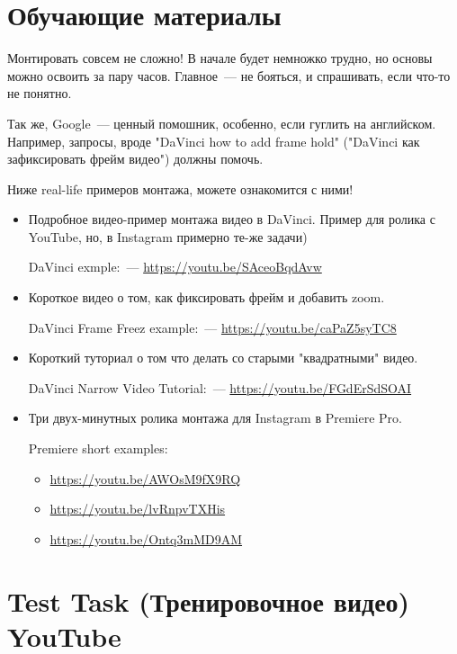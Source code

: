 \documentclass[
a4paper, %
12pt, %
article,
onecolumn, %
openany, %
]{memoir}
\begin{document}
\newpage
\section{Обучающие материалы}

Монтировать совсем не сложно! В начале будет немножко трудно, но основы можно
освоить за пару часов. Главное~--- не бояться, и спрашивать, если что-то не понятно.

Так же, Google~--- ценный помошник, особенно, если гуглить на английском.
Например, запросы, вроде
"DaVinci how to add frame hold" ("DaVinci как зафиксировать фрейм видео")
должны помочь.

Ниже real-life примеров монтажа, можете ознакомится с ними!
\begin{itemize}
    \item Подробное видео-пример монтажа видео в DaVinci.
        Пример для ролика с YouTube, но, в
        Instagram примерно те-же задачи)

        DaVinci exmple:~--- \href{https://youtu.be/SAceoBqdAvw}{https://youtu.be/SAceoBqdAvw}
    \item Короткое видео о том, как фиксировать фрейм и добавить zoom.

        DaVinci Frame Freez example:~--- \href{https://youtu.be/caPaZ5syTC8}{https://youtu.be/caPaZ5syTC8}
    \item Короткий туториал о том что делать со старыми "квадратными" видео.

        DaVinci Narrow Video Tutorial:~--- \href{https://youtu.be/FGdErSdSOAI}{https://youtu.be/FGdErSdSOAI}

    \item Три двух-минутных ролика монтажа для Instagram в Premiere Pro.

        Premiere short examples:
        \begin{itemize}
            \item \href{https://youtu.be/AWOsM9fX9RQ}{https://youtu.be/AWOsM9fX9RQ}
            \item \href{https://youtu.be/lvRnpvTXHis}{https://youtu.be/lvRnpvTXHis}
            \item \href{https://youtu.be/Ontq3mMD9AM}{https://youtu.be/Ontq3mMD9AM}
        \end{itemize}
\end{itemize}




\newpage
\section{Test Task (Тренировочное видео) YouTube}
\end{document}
